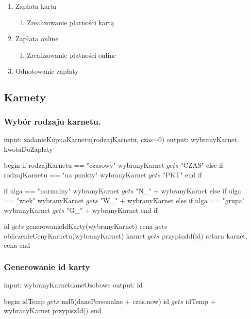 \begin{multicols}{2}
\begin{enumerate}
\begin{enumerate}
\begin{enumerate}
                \end{enumerate}
            \item Zapłata kartą
            	\begin{enumerate}
                	\item Zrealizowanie płatności kartą
                \end{enumerate}
            \item Zapłata online
            	\begin{enumerate}
                	\item Zrealizowanie płatności online
                \end{enumerate}
            \item Odnotowanie zapłaty
        \end{enumerate}
\end{enumerate}
\end{multicols}

\newpage
\subsection{Karnety}
\subsubsection{Wybór rodzaju karnetu.}
\begin{algorithm}[caption={1.1.1 Wybór rodzaju karnetu.}, label={alg1}]
 input: zadanieKupnaKarnetu(rodzajKarnetu, czas=0)
 output: wybranyKarnet, kwotaDoZaplaty
 
begin
  if rodzajKarnetu == "czasowy" 
    wybranyKarnet $gets$ "CZAS"
  else if rodzajKarnetu == "na punkty" 
    wybranyKarnet $gets$ "PKT"
  end if

  if ulga == "normalny" 
    wybranyKarnet $gets$ "N_" + wybranyKarnet
  else if ulga == "wiek" 
    wybranyKarnet $gets$ "W_" + wybranyKarnet
  else if ulga == "grupa" 
    wybranyKarnet $gets$ "G_" + wybranyKarnet
  end if

  id $gets$ generowanieIdKarty(wybranyKarnet)
  cena $gets$ obliczenieCenyKarnetu(wybranyKarnet)
  karnet $gets$ przypiszId(id)
  return karnet, cena
end
\end{algorithm}

\subsubsection{Generowanie id karty}
\begin{algorithm}[caption={1.1.2 Generowanie id karty}, label={alg1}]
  input: wybranyKarnetdaneOsobowe
  output: id

begin
  idTemp $gets$ md5(danePersonalne + czas.now)
  id $gets$ idTemp + wybranyKarnet
  przypiszId()
end
\end{algorithm}

